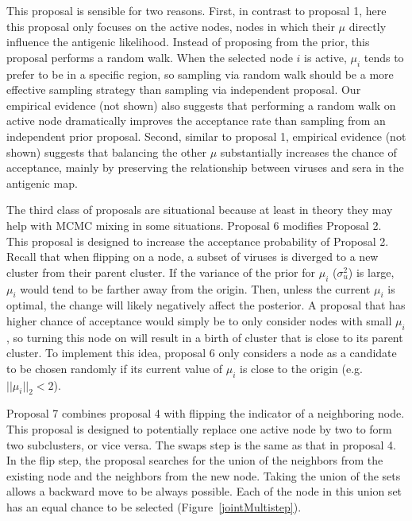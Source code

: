 \documentclass[11pt,oneside,letterpaper]{article}
\begin{document}
This proposal is sensible for two reasons.
First, in contrast to proposal 1, here this proposal only focuses on the active nodes, nodes in which their $\mu$ directly influence the antigenic likelihood.
Instead of proposing from the prior, this proposal performs a random walk.
When the selected node $i$ is active, $\mu_i$ tends to prefer to be in a specific region, so sampling via random walk should be a more effective sampling strategy than sampling via independent proposal.
Our empirical evidence (not shown) also suggests that performing a random walk on active node dramatically improves the acceptance rate than sampling from an independent prior proposal.
Second, similar to proposal 1, empirical evidence (not shown) suggests that balancing the other $\mu$ substantially increases the chance of acceptance, mainly by preserving the relationship between viruses and sera in the antigenic map.


The third class of proposals are situational because at least in theory they may help with MCMC mixing in some situations.
Proposal 6 modifies Proposal 2. 
This proposal is designed to increase the acceptance probability of Proposal 2. 
Recall that when flipping on a node, a subset of viruses is diverged to a new cluster from their parent cluster.
If the variance of the prior for $\mu_i$ ($\sigma^2_u$) is large, $\mu_i$ would tend to be farther away from the origin. 
Then, unless the current $\mu_i$ is optimal, the change will likely negatively affect the posterior.  
A proposal that has higher chance of acceptance would simply be to only consider nodes with small $\mu_i$, so turning this node on will result in a birth of cluster that is close to its parent cluster.
To implement this idea, proposal 6 only considers a node as a candidate to be chosen randomly if its current value of $\mu_i$ is close to the origin (e.g. $ || \mu_i ||_2  < 2$).


Proposal 7 combines proposal 4 with flipping the indicator of a neighboring node. 
This proposal is designed to potentially replace one active node by two to form two subclusters, or vice versa.
The swaps step is the same as that in proposal 4.
In the flip step, the proposal searches for the union of the neighbors from the existing node and the neighbors from the new node.
Taking the union of the sets allows a backward move to be always possible.
Each of the node in this union set has an equal chance to be selected (Figure~\ref{jointMultistep}).
\end{document}
